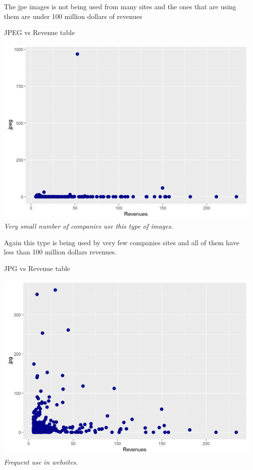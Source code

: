 \documentclass{book}
\begin{document}
The jpe images is not being used from many sites and the ones that are using them are under 100 million dollars of revenues
\begin{table}[H]
\centering
\caption{JPEG vs Revenue table}
\begin{center}
\includegraphics[scale=0.5]{../R/photos/58_jpeg_rev.png}    \\
\textit{Very small number of companies use this type of images.}
\end{center}
\end{table}
Again this type is being used by very few companies sites and all of them have less than 100 million dollars revenues.
\begin{table}[H]
\centering
\caption{JPG vs Revenue table}
\begin{center}
\includegraphics[scale=0.5]{../R/photos/59_jpg_rev.png}    \\
\textit{Frequent use in websites.}
\end{center}
\end{table}
\end{document}
